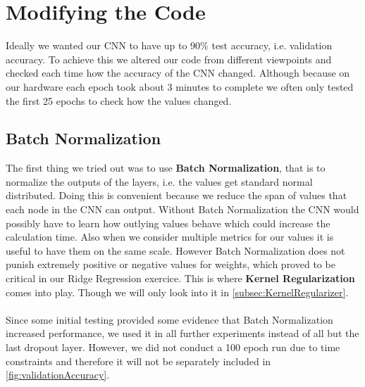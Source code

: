 \documentclass{article}
\begin{document}
	\section{Modifying the Code}
	\label{sec:ModifyingTheCode}
	Ideally we wanted our CNN to have up to 90\% test accuracy, i.e. validation accuracy. To achieve this we altered our code from different viewpoints and checked each time how the accuracy of the CNN changed. Although because on our hardware each epoch took about 3 minutes to complete we often only tested the first 25 epochs to check how the values changed. \\
	
	\subsection{Batch Normalization}
	\label{subsec:BatchNormalization}
	The first thing we tried out was to use \textbf{Batch Normalization}, that is to normalize the outputs of the layers, i.e. the values get standard normal distributed. Doing this is convenient because we reduce the span of values that each node in the CNN can output. Without Batch Normalization the CNN would possibly have to learn how outlying values behave which could increase the calculation time. Also when we consider multiple metrics for our values it is useful to have them on the same scale. However Batch Normalization does not punish extremely positive or negative values for weights, which proved to be critical in our Ridge Regression exercice. This is where \textbf{Kernel Regularization} comes into play. Though we will only look into it in \autoref{subsec:KernelRegularizer}. \\
	\\
	Since some initial testing provided some evidence that Batch Normalization increased performance, we used it in all further experiments instead of all but the last dropout layer. However, we did not conduct a 100 epoch run due to time constraints and therefore it will not be separately included in \autoref{fig:validationAccuracy}. 
	
	
	 
\end{document}
